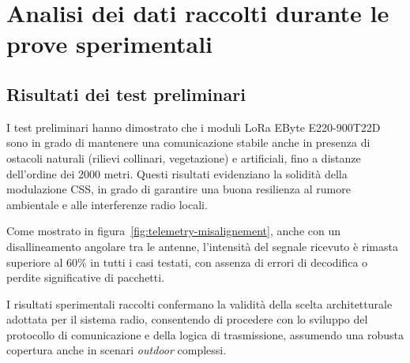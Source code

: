 \documentclass[12pt,a4paper,twoside]{book}
\begin{document}
\section{Analisi dei dati raccolti durante le prove sperimentali}

\subsection{Risultati dei test preliminari}
I test preliminari hanno dimostrato che i moduli \ac{LoRa} EByte E220-900T22D
sono in grado di mantenere una comunicazione stabile anche in presenza di ostacoli naturali
(rilievi collinari, vegetazione) e artificiali, fino a distanze dell’ordine dei 2000 metri.
Questi risultati evidenziano la solidità della modulazione \ac{CSS}, in grado di garantire
una buona resilienza al rumore ambientale e alle interferenze radio locali.

Come mostrato in figura~\ref{fig:telemetry-misalignement}, anche con un disallineamento angolare
tra le antenne, l’intensità del segnale ricevuto è rimasta superiore al 60\% in tutti i casi testati,
con assenza di errori di decodifica o perdite significative di pacchetti.

I risultati sperimentali raccolti confermano la validità della scelta architetturale
adottata per il sistema radio, consentendo di procedere con lo sviluppo del
protocollo di comunicazione e della logica di trasmissione, assumendo una robusta
copertura anche in scenari \emph{outdoor} complessi.
\end{document}
